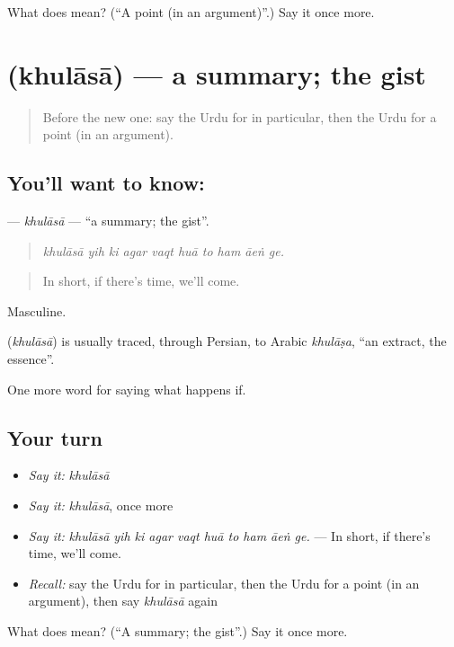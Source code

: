 \begin{tcolorbox}[breakable,colback=teal!4,colframe=teal!35!black,title={Before you move on}]
What does  mean? (\textquotedblleft{}A point (in an argument)\textquotedblright{}.) Say it once more.
\end{tcolorbox}
\section[\texorpdfstring{\ur{خلاصہ} (khulāsā)}{خلاصہ (khulāsā)}]{ (khulāsā) — a summary; the gist}

\label{lesson:UR-C542-khulasa}



\begin{quote}
Before the new one: say the Urdu for in particular, then the Urdu for a point (in an argument).
\end{quote}

\subsection*{You'll want to know: }
\textbf{} — \emph{khulāsā} — \textquotedblleft{}a summary; the gist\textquotedblright{}.

\begin{quote}
         
\end{quote}

\begin{quote}
\emph{khulāsā yih ki agar vaqt huā to ham āeṅ ge.}
\end{quote}

\begin{quote}
In short, if there's time, we'll come.
\end{quote}

Masculine.

\begin{cousinweb}
\textbf{} (\emph{khulāsā}) is usually traced, through Persian, to Arabic \emph{khulāṣa}, \textquotedblleft{}an extract, the essence\textquotedblright{}.
\end{cousinweb}

\begin{grammarlens}[title={What you've built}]
One more word for saying what happens if.
\end{grammarlens}

\subsection*{Your turn}
\begin{itemize}
\raggedright
  \item \emph{Say it:} \emph{khulāsā}
  \item \emph{Say it:} \emph{khulāsā}, once more
  \item \emph{Say it:} \emph{khulāsā yih ki agar vaqt huā to ham āeṅ ge.} — In short, if there's time, we'll come.
  \item \emph{Recall:} say the Urdu for in particular, then the Urdu for a point (in an argument), then say \emph{khulāsā} again
\end{itemize}

\begin{tcolorbox}[breakable,colback=teal!4,colframe=teal!35!black,title={Before you move on}]
What does  mean? (\textquotedblleft{}A summary; the gist\textquotedblright{}.) Say it once more.
\end{tcolorbox}
